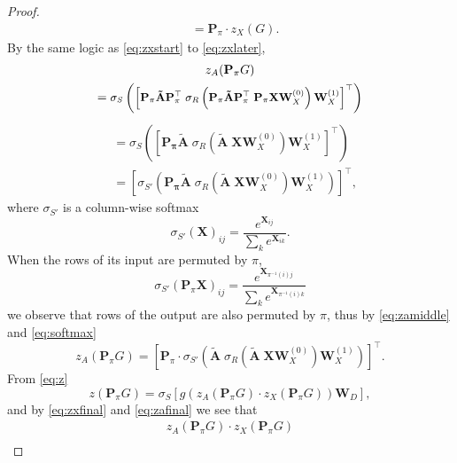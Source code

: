 \documentclass{article}
\renewcommand{\vec}[1]{\mathbf{#1}}
\renewcommand{\P}{\mathbf{P}}
\newcommand{\T}{\top}
\theoremstyle{definition}
\begin{document}
\begin{proof}
\begin{align}
    \label{eq:zxfinal}
    &= \P_\pi \cdot z_X(G).
  \end{align}
  By the same logic as \autoref{eq:zxstart} to \ref{eq:zxlater},
  \small
  \begin{multline}
    z_A(\P_\pi G) \\
    = \mbox{\small$ \sigma_S \left( \left[ \vec{\P_\pi \tilde{A} \P_\pi^\T} \; \sigma_R \left( \vec{\P_\pi \tilde{A} \P_\pi^\T} \;\P_\pi  \vec{X} \vec{W}_X^{(0)} \right) \vec{W}_X^{(1)} \right]^\T \right)$}
  \end{multline}
  \normalsize
  \begin{align}
    &= \sigma_S \left( \left[ \vec{\P_\pi \tilde{A}} \; \sigma_R \left( \vec{\tilde{A} } \; \vec{X} \vec{W}_X^{(0)} \right) \vec{W}_X^{(1)} \right]^\T \right) \\
    \label{eq:zamiddle}
    &= \left[ \sigma_{S'} \left( \vec{\P_\pi \tilde{A}} \; \sigma_R \left( \vec{\tilde{A} } \; \vec{X} \vec{W}_X^{(0)} \right) \vec{W}_X^{(1)} \right) \right]^\T,
  \end{align}
where $\sigma_{S'}$ is a column-wise softmax
  \begin{equation}
    \sigma_{S'}(\vec{X})_{ij} = \frac{e^{\vec{X}_{ij}}} {\sum_k e^{\vec{X}_{ik}}}.
  \end{equation}
When the rows of its input are permuted by $\pi$,
  \begin{equation}
    \sigma_{S'}(\P_\pi \vec{X})_{ij} = \frac{e^{\vec{X}_{\pi^{-1}(i)j}}} {\sum_k e^{\vec{X}_{\pi^{-1}(i)k}}}
    \label{eq:softmax}
  \end{equation}
  we observe that rows of the output are also permuted by $\pi$, thus by \autoref{eq:zamiddle} and \ref{eq:softmax}
  \small
  \begin{equation}
    z_A(\P_\pi G) = \left[ \P_\pi \cdot \sigma_{S'} \left( \vec{\tilde{A}} \; \sigma_R \left( \vec{\tilde{A} } \; \vec{X} \vec{W}_X^{(0)} \right) \vec{W}_X^{(1)} \right) \right]^\T.
    \label{eq:zafinal}
  \end{equation}\normalsize
From \autoref{eq:z}
\begin{equation}
  \label{eq:zp}
  z(\P_\pi G) = \sigma_S \left[ g\left( z_A \left( \P_\pi G\right) \cdot z_X\left(\P_\pi G\right) \right) \vec{W}_D \right],
\end{equation}
and by \autoref{eq:zxfinal} and \ref{eq:zafinal} we see that
\small
  \begin{multline}
    \label{eq:zazxstart}
    z_A \left( \P_\pi G\right) \cdot z_X\left(\P_\pi G\right) \\

\end{multline}
\end{proof}
\end{document}
